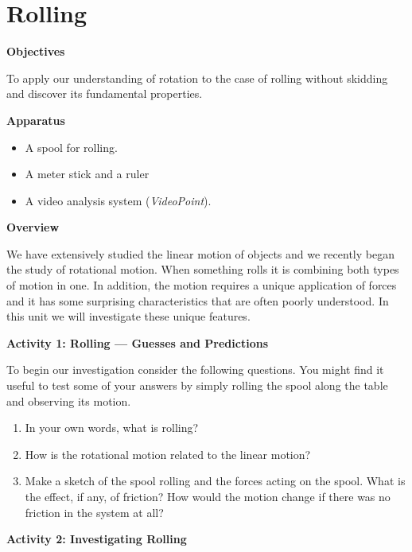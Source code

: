 
\section{Rolling}

\makelabheader %

\textbf{Objectives }

To apply our understanding of rotation to the case of rolling without skidding
and discover its fundamental properties. 

\textbf{Apparatus}

\begin{itemize}
\item A spool for rolling. 
\item A meter stick and a ruler 
\item A video analysis system (\textit{VideoPoint}).
\end{itemize}
\textbf{Overview }

We have extensively studied the linear motion of objects and we recently began
the study of rotational motion. When something rolls it is combining both types
of motion in one. In addition, the motion requires a unique application of forces
and it has some surprising characteristics that are often poorly understood.
In this unit we will investigate these unique features.

\textbf{Activity 1: Rolling --- Guesses and Predictions }

To begin our investigation consider the following questions. You might find
it useful to test some of your answers by simply rolling the spool along the
table and observing its motion.

\begin{enumerate}
\item In your own words, what is rolling?
\answerspace{20mm}

\item How is the rotational motion related to the linear motion?
\answerspace{20mm}

\item Make a sketch of the spool rolling and the forces acting on the spool. What
is the effect, if any, of friction? How would the motion change if there was
no friction in the system at all?
\answerspace{30mm}
\end{enumerate}

\pagebreak[2]
\textbf{Activity 2: Investigating Rolling} 

